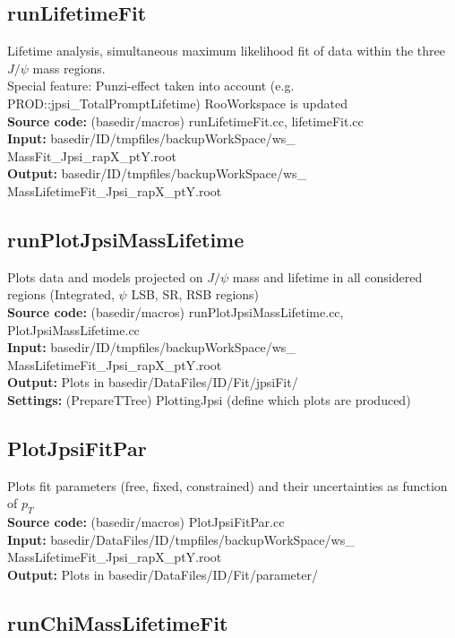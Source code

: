 \documentclass{article}
\begin{document}
\subsection{runLifetimeFit}

Lifetime analysis, simultaneous maximum likelihood fit of data within the three $J/\psi$ mass regions. \\Special feature: Punzi-effect taken into account (e.g. PROD::jpsi\_TotalPromptLifetime)
RooWorkspace is updated
\\{\bf Source code:} (basedir/macros) runLifetimeFit.cc, lifetimeFit.cc
\\{\bf Input:} basedir/ID/tmpfiles/backupWorkSpace/ws\_ MassFit\_Jpsi\_rapX\_ptY.root
\\{\bf Output:} basedir/ID/tmpfiles/backupWorkSpace/ws\_ MassLifetimeFit\_Jpsi\_rapX\_ptY.root

\subsection{runPlotJpsiMassLifetime}

Plots data and models projected on $J/\psi$ mass and lifetime in all considered regions (Integrated, $\psi$ LSB, SR, RSB regions)
\\{\bf Source code:} (basedir/macros) runPlotJpsiMassLifetime.cc, PlotJpsiMassLifetime.cc
\\{\bf Input:} basedir/ID/tmpfiles/backupWorkSpace/ws\_ MassLifetimeFit\_Jpsi\_rapX\_ptY.root
\\{\bf Output:} Plots in basedir/DataFiles/ID/Fit/jpsiFit/
\\{\bf Settings:} (PrepareTTree)  PlottingJpsi (define which plots are produced)

\subsection{PlotJpsiFitPar}

Plots fit parameters (free, fixed, constrained) and their uncertainties as function of $p_T$
\\{\bf Source code:} (basedir/macros) PlotJpsiFitPar.cc
\\{\bf Input:} basedir/DataFiles/ID/tmpfiles/backupWorkSpace/ws\_ MassLifetimeFit\_Jpsi\_rapX\_ptY.root
\\{\bf Output:} Plots in basedir/DataFiles/ID/Fit/parameter/

\subsection{runChiMassLifetimeFit}
\end{document}
